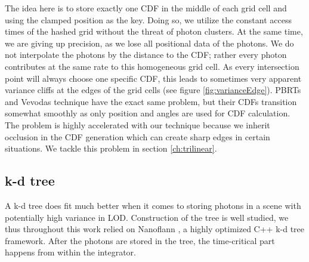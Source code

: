The idea here is to store exactly one CDF in the middle of each grid cell and using the clamped position as the key. Doing so, we utilize the constant access times of the hashed grid without the threat of photon clusters. At the same time, we are giving up precision, as we lose all positional data of the photons. We do not interpolate the photons by the distance to the CDF; rather every photon contributes at the same rate to this homogeneous grid cell. As every intersection point will always choose one specific CDF, this leads to sometimes very apparent variance cliffs at the edges of the grid cells (see figure \ref{fig:varianceEdge}). PBRTs \cite{pbrt} and Vevodas \cite{Vevoda}  technique have the exact same problem, but their CDFs transition somewhat smoothly as only position and angles are used for CDF calculation. The problem is highly accelerated with our technique because we inherit occlusion in the CDF generation which can create sharp edges in certain situations. We tackle this problem in section \ref{ch:trilinear}.


\subsection{k-d tree}
\label{sec:pneekdtree}

A k-d tree does fit much better when it comes to storing photons in a scene with potentially high variance in LOD. Construction of the tree is well studied, we thus throughout this work relied on Nanoflann \cite{blanco2014nanoflann}, a highly optimized C++ k-d tree framework. After the photons are stored in the tree, the time-critical part happens from within the integrator. 

